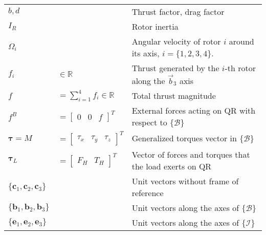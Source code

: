 \begin{tabularx}{\linewidth}{lll}
		$ b, d $ && Thrust factor, drag factor\\
		$ {I}_R$ && Rotor inertia \\
		$ \Omega_i $ && Angular velocity of rotor $ i $ around its axis, $ i=\{1,2,3,4\} $.\\	
		$ f_i $&$ \in\mathbb{R} $&Thrust generated by the $ i $-th rotor along the $ \vec{b}_3 $ axis\\	
		$ f $ &$ =\sum_{i=1}^{4}f_i \in\mathbb{R} $& Total thrust magnitude\\
		$ f^B $&$ =\begin{bmatrix} \!0 &\!\! 0&\!\! f \end{bmatrix}^T $     & External forces acting on QR with respect to $ \{\mathcal{B}\}   $                \\
		$ \boldsymbol{\tau}=M$&$=\begin{bmatrix} \!\tau_x &\!\! \tau_y&\!\! \tau_z \end{bmatrix}^T $     & Generalized torques vector in $ \{\mathcal{B}\}   $                  \\
		$ \boldsymbol{\tau}_L$&$ =\begin{bmatrix}\!F_H&\!\!T_H\end{bmatrix}^T$ &Vector of forces and torques that the load exerts on QR \\

		$ \{\mathbf{c}_1,\mathbf{c}_2,\mathbf{c}_3\} $     && Unit vectors without frame of reference\\
		$ \{\mathbf{b}_1,\mathbf{b}_2,\mathbf{b}_3\} $ && Unit vectors along the axes of $ \{\mathcal{B}\} $\\
		$ \{\mathbf{e}_1,\mathbf{e}_2,\mathbf{e}_3\} $ && Unit vectors along the axes of $ \{\mathcal{I}\} $\\

\end{tabularx}


